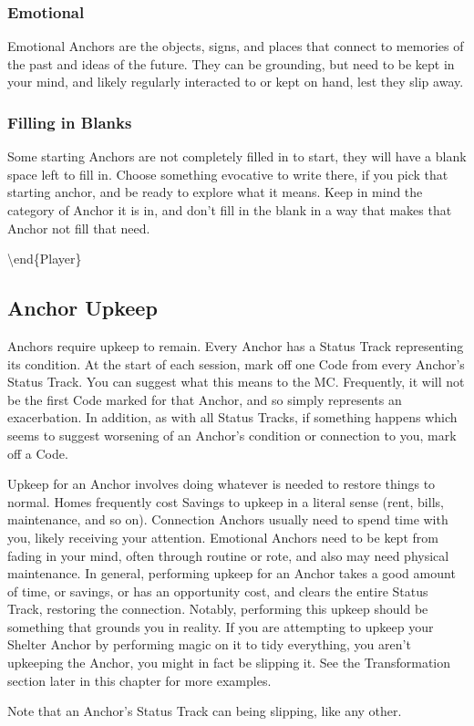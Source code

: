 \documentclass[
  oneside,
  statementpaper,
  9pt]{memoir}
\begin{document}
\hypertarget{emotional}{%
\subsubsection{Emotional}\label{emotional}}

Emotional Anchors are the objects, signs, and places that connect to
memories of the past and ideas of the future. They can be grounding, but
need to be kept in your mind, and likely regularly interacted to or kept
on hand, lest they slip away.

\hypertarget{filling-in-blanks}{%
\subsubsection{Filling in Blanks}\label{filling-in-blanks}}

Some starting Anchors are not completely filled in to start, they will
have a blank space left to fill in. Choose something evocative to write
there, if you pick that starting anchor, and be ready to explore what it
means. Keep in mind the category of Anchor it is in, and don't fill in
the blank in a way that makes that Anchor not fill that need.

\textbackslash end\{Player\}

\hypertarget{anchor-upkeep}{%
\subsection{Anchor Upkeep}\label{anchor-upkeep}}

\begin{Player}

Anchors require upkeep to remain. Every Anchor has a Status Track representing its condition. At the start of each session, mark off one Code from every Anchor’s Status Track. You can suggest what this means to the MC. Frequently, it will not be the first Code marked for that Anchor, and so simply represents an exacerbation. In addition, as with all Status Tracks, if something happens which seems to suggest worsening of an Anchor’s condition or connection to you, mark off a Code.

Upkeep for an Anchor involves doing whatever is needed to restore things to normal. Homes frequently cost Savings to upkeep in a literal sense (rent, bills, maintenance, and so on). Connection Anchors usually need to spend time with you, likely receiving your attention. Emotional Anchors need to be kept from fading in your mind, often through routine or rote, and also may need physical maintenance. In general, performing upkeep for an Anchor takes a good amount of time, or savings, or has an opportunity cost, and clears the entire Status Track, restoring the connection. Notably, performing this upkeep should be something that grounds you in reality. If you are attempting to upkeep your Shelter Anchor by performing magic on it to tidy everything, you aren’t upkeeping the Anchor, you might in fact be slipping it. See the Transformation section later in this chapter for more examples.

Note that an Anchor’s Status Track can being slipping, like any other.

\end{Player}
\end{document}
